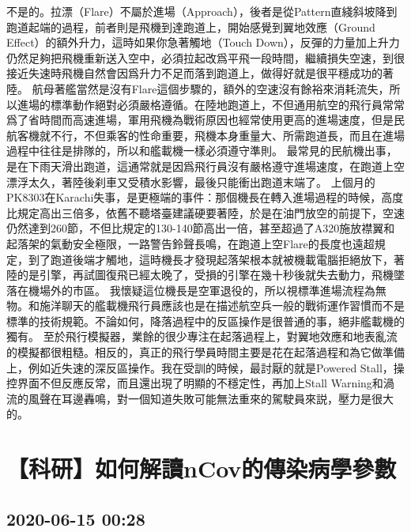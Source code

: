 \documentclass[twocolumn]{ctexart}
\begin{document}
不是的。拉漂（Flare）不屬於進場（Approach），後者是從Pattern直綫斜坡降到跑道起端的過程，前者則是飛機到達跑道上，開始感覺到翼地效應（Ground Effect）的額外升力，這時如果你急著觸地（Touch Down），反彈的力量加上升力仍然足夠把飛機重新送入空中，必須拉起改爲平飛一段時間，繼續損失空速，到很接近失速時飛機自然會因爲升力不足而落到跑道上，做得好就是很平穩成功的著陸。
航母著艦當然是沒有Flare這個步驟的，額外的空速沒有餘裕來消耗流失，所以進場的標準動作絕對必須嚴格遵循。在陸地跑道上，不但通用航空的飛行員常常爲了省時間而高速進場，軍用飛機為戰術原因也經常使用更高的進場速度，但是民航客機就不行，不但乘客的性命重要，飛機本身重量大、所需跑道長，而且在進場過程中往往是排隊的，所以和艦載機一樣必須遵守準則。
最常見的民航機出事，是在下雨天滑出跑道，這通常就是因爲飛行員沒有嚴格遵守進場速度，在跑道上空漂浮太久，著陸後刹車又受積水影響，最後只能衝出跑道末端了。
上個月的PK8303在Karachi失事，是更極端的事件：那個機長在轉入進場過程的時候，高度比規定高出三倍多，依舊不聽塔臺建議硬要著陸，於是在油門放空的前提下，空速仍然達到260節，不但比規定的130-140節高出一倍，甚至超過了A320施放襟翼和起落架的氣動安全極限，一路警告鈴聲長鳴，在跑道上空Flare的長度也遠超規定，到了跑道後端才觸地，這時機長才發現起落架根本就被機載電腦拒絕放下，著陸的是引擎，再試圖復飛已經太晚了，受損的引擎在幾十秒後就失去動力，飛機墜落在機場外的市區。
我懷疑這位機長是空軍退役的，所以視標準進場流程為無物。和施洋聊天的艦載機飛行員應該也是在描述航空兵一般的戰術運作習慣而不是標準的技術規範。不論如何，降落過程中的反區操作是很普通的事，絕非艦載機的獨有。
至於飛行模擬器，業餘的很少專注在起落過程上，對翼地效應和地表亂流的模擬都很粗糙。相反的，真正的飛行學員時間主要是花在起落過程和為它做準備上，例如近失速的深反區操作。我在受訓的時候，最討厭的就是Powered Stall，操控界面不但反應反常，而且還出現了明顯的不穩定性，再加上Stall Warning和渦流的風聲在耳邊轟鳴，對一個知道失敗可能無法重來的駕駛員來説，壓力是很大的。
\section*{【科研】如何解讀nCov的傳染病學參數}
\subsection*{2020-06-15 00:28}
\end{document}
